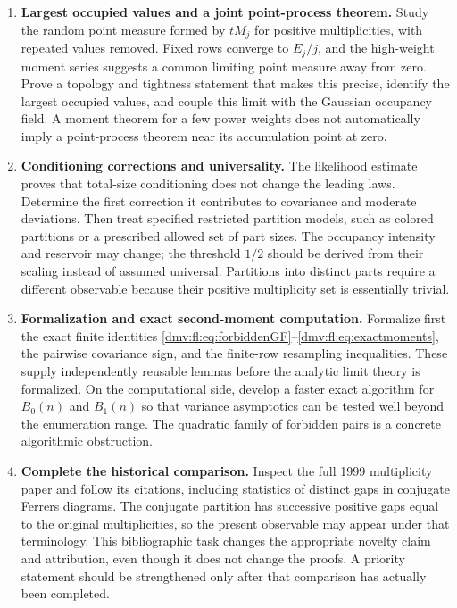 \documentclass[11pt,letterpaper]{article}
\numberwithin{equation}{section}
\theoremstyle{definition}\newtheorem{definition}[theorem]{Definition}
\theoremstyle{remark}\newtheorem{remark}[theorem]{Remark}
\begin{document}
\begin{enumerate}[leftmargin=*,itemsep=8pt]
\item \textbf{Largest occupied values and a joint point-process theorem.}
Study the random point measure formed by $tM_j$ for positive
multiplicities, with repeated values removed. Fixed rows converge to
$E_j/j$, and the high-weight moment series suggests a common limiting
point measure away from zero. Prove a topology and tightness statement
that makes this precise, identify the largest occupied values, and
couple this limit with the Gaussian occupancy field. A moment theorem
for a few power weights does not automatically imply a point-process
theorem near its accumulation point at zero.

\item \textbf{Conditioning corrections and universality.}
The likelihood estimate proves that total-size conditioning does not
change the leading laws. Determine the first correction it contributes
to covariance and moderate deviations. Then treat specified restricted
partition models, such as colored partitions or a prescribed allowed
set of part sizes. The occupancy intensity and reservoir may change;
the threshold $1/2$ should be derived from their scaling instead of
assumed universal. Partitions into distinct parts require a different
observable because their positive multiplicity set is essentially
trivial.

\item \textbf{Formalization and exact second-moment computation.}
Formalize first the exact finite identities
\eqref{dmv:fl:eq:forbiddenGF}--\eqref{dmv:fl:eq:exactmoments}, the pairwise covariance
sign, and the finite-row resampling inequalities. These supply
independently reusable lemmas before the analytic limit theory is
formalized. On the computational side, develop a faster exact
algorithm for $B_0(n)$ and $B_1(n)$ so that variance asymptotics can be
tested well beyond the enumeration range. The quadratic family of
forbidden pairs is a concrete algorithmic obstruction.

\item \textbf{Complete the historical comparison.}
Inspect the full 1999 multiplicity paper and follow its citations,
including statistics of distinct gaps in conjugate Ferrers diagrams.
The conjugate partition has successive positive gaps equal to the
original multiplicities, so the present observable may appear under
that terminology. This bibliographic task changes the appropriate
novelty claim and attribution, even though it does not change the
proofs. A priority statement should be strengthened only after that
comparison has actually been completed.
\end{enumerate}
\end{document}
